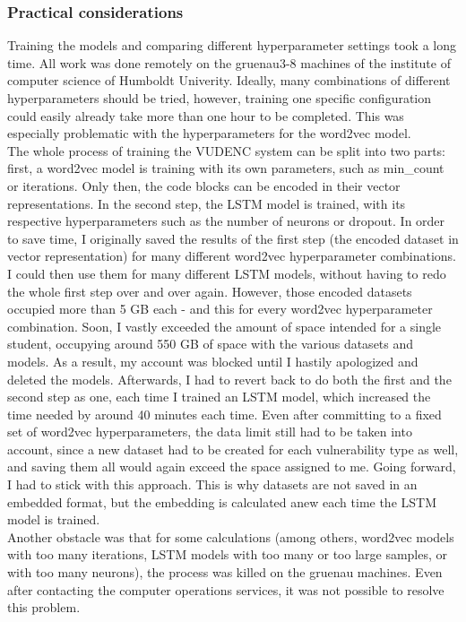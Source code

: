 \documentclass[
a4paper,
pagesize,
pdftex,
12pt,
twoside, %
BCOR=5mm, %
ngerman,
fleqn,
final,
]{scrartcl}
\begin{document}
	\subsubsection{Practical considerations}
	Training the models and comparing different hyperparameter settings took a long time. All work was done remotely on the gruenau3-8 machines of the institute of computer science of Humboldt Univerity. Ideally, many combinations of different hyperparameters should be tried, however, training one specific configuration could easily already take more than one hour to be completed. This was especially problematic with the hyperparameters for the word2vec model.\\
	The whole process of training the VUDENC system can be split into two parts: first, a word2vec model is training with its own parameters, such as min\_count or iterations. Only then, the code blocks can be encoded in their vector representations. In the second step, the LSTM model is trained, with its respective hyperparameters such as the number of neurons or dropout. In order to save time, I originally saved the results of the first step (the encoded dataset in vector representation) for many different word2vec hyperparameter combinations. I could then use them for many different LSTM models, without having to redo the whole first step over and over again. However, those encoded datasets occupied more than 5 GB each - and this for every word2vec hyperparameter combination. Soon, I vastly exceeded the amount of space intended for a single student, occupying around 550 GB of space with the various datasets and models. As a result, my account was blocked until I hastily apologized and deleted the models. Afterwards, I had to revert back to do both the first and the second step as one, each time I trained an LSTM model, which increased the time needed by around 40 minutes each time. Even after committing to a fixed set of word2vec hyperparameters, the data limit still had to be taken into account, since a new dataset had to be created for each vulnerability type as well, and saving them all would again exceed the space assigned to me. Going forward, I had to stick with this approach. This is why datasets are not saved in an embedded format, but the embedding is calculated anew each time the LSTM model is trained.\\
	Another obstacle was that for some calculations (among others, word2vec models with too many iterations, LSTM models with too many or too large samples, or with too many neurons), the process was killed on the gruenau machines. Even after contacting the computer operations services, it was not possible to resolve this problem.\\
\end{document}
